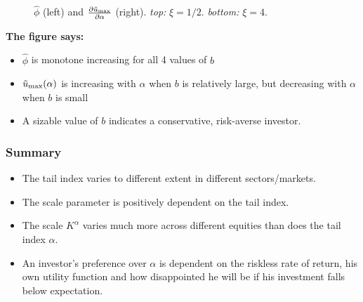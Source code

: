 \documentclass{beamer}
\begin{document}
\begin{frame}
\begin{minipage}[t]{0.5\linewidth}
\begin{figure}[htb!]
\begin{minipage}{0.5\linewidth}
      \end{minipage}
      \caption{$\hat\phi$ (left) and
        ${\partial \tilde u_{\rm max} \over \partial \alpha}$ (right).
        {\em top:} $\xi = 1/2$. {\em bottom:} $\xi = 4$.
      }
      \label{fig:htfg}
    \end{figure}
  \end{minipage}\hfill
  \begin{minipage}[t]{0.5\linewidth}
    \textcolor[HTML]{990033}{\bf The figure says:}
    \begin{itemize}
    \item  $\hat\phi$ is monotone increasing for all 4 values of $b$
    \item $\tilde u_{\rm max}(\alpha)$ is increasing with $\alpha$
      when $b$ is relatively large, but  decreasing with $\alpha$ when
      $b$ is small
    \item A sizable value of $b$ indicates a conservative, risk-averse investor.
    \end{itemize}
  \end{minipage}
\end{frame}

\begin{frame}
  \frametitle{Summary}
  \begin{itemize}
  \item The tail index varies to different extent in different
    sectors/markets.
  \item The scale parameter is positively dependent on the tail index.
  \item The scale $K^{\alpha}$ varies much more across different
    equities than does the tail index $\alpha$.
  \item An investor's preference over $\alpha$ is dependent on the
    riskless rate of return, his own utility function and how
    disappointed he will be if his investment falls below
    expectation.
  \end{itemize}
\end{frame}
\end{document}
